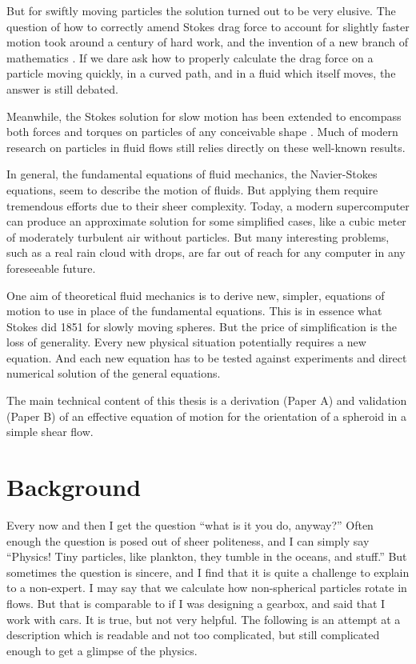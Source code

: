 \documentclass[thesis.tex]{subfiles}
\begin{document}
But for swiftly moving particles
the solution turned out to be very elusive. The question of how to correctly amend Stokes drag force to account for slightly faster motion took around a century of hard work, and the invention of a new branch of mathematics \cite{veysey2007}. If we dare ask how to properly calculate the drag force on a particle moving quickly, in a curved path, and in a fluid which itself moves, the answer is still debated.

Meanwhile, the Stokes solution for slow motion has been extended to encompass both forces and torques on particles of any conceivable shape \cite{jeffery1922,brenner1974,kim1991}. Much of modern research on particles in fluid flows still relies directly on these well-known results.

In general, the fundamental equations of fluid mechanics, the Navier-Stokes equations, seem to describe the motion of fluids. But applying them require tremendous efforts due to their sheer complexity. Today, a modern supercomputer can produce an approximate solution for some simplified cases, like a cubic meter of moderately turbulent air without particles. But many interesting problems, such as a real rain cloud with drops, are far out of reach for any computer in any foreseeable future.

One aim of theoretical fluid mechanics is to derive new, simpler, equations of motion to use in place of the fundamental equations. This is in essence what Stokes did 1851 for slowly moving spheres. But the price of simplification is the loss of generality. Every new physical situation potentially requires a new equation. And each new equation has to be tested against experiments and direct numerical solution of the general equations.

The main technical content of this thesis is a derivation (Paper A) and validation (Paper B) of an effective equation of motion for the orientation of a spheroid in a simple shear flow. 

\chapter{Background}\label{sec:background}

 Every now and then I get the question ``what is it you do, anyway?'' Often enough the question is posed out of sheer politeness, and I can simply say ``Physics! Tiny particles, like plankton, they tumble in the oceans, and stuff.'' But sometimes the question is sincere, and I find that it is quite a challenge to explain to a non-expert. I may say that we calculate how non-spherical particles rotate in flows. But that is comparable to if I was designing a gearbox, and said that I work with cars. It is true, but not very helpful. The following is an attempt at a description which is readable and not too complicated, but still complicated enough to get a glimpse of the physics.
\end{document}

